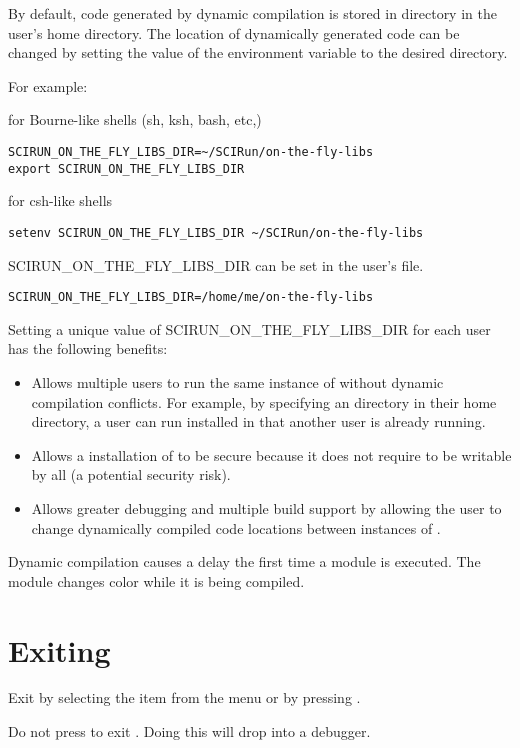 By default, code generated by dynamic compilation is stored in
directory  in the user's home directory.
The location of dynamically generated code can be changed by setting
the value of the environment variable
 to the desired directory.

For example:

for Bourne-like shells (sh, ksh, bash, etc,)

\begin{verbatim}
SCIRUN_ON_THE_FLY_LIBS_DIR=~/SCIRun/on-the-fly-libs
export SCIRUN_ON_THE_FLY_LIBS_DIR
\end{verbatim}

for csh-like shells

\begin{verbatim}
setenv SCIRUN_ON_THE_FLY_LIBS_DIR ~/SCIRun/on-the-fly-libs
\end{verbatim}

SCIRUN\_ON\_THE\_FLY\_LIBS\_DIR can be set in the user's
 file.

\begin{verbatim}
SCIRUN_ON_THE_FLY_LIBS_DIR=/home/me/on-the-fly-libs
\end{verbatim}

Setting a unique value of SCIRUN\_ON\_THE\_FLY\_LIBS\_DIR for each
\sr{} user has the following benefits:

\begin{itemize}
\item Allows multiple users  to run the same 
  instance of \sr{} without
  dynamic compilation conflicts.  For example, by specifying an
   directory in their home directory, a user
  can run \sr{} installed in  that another user
  is already running.

\item Allows a  installation of \sr{}
  to be secure because it does not require
   to be writable by
  all (a potential security risk).

\item Allows greater debugging and multiple build support by
  allowing the user to change dynamically compiled code locations
  between instances of \sr{}.

\end{itemize}

Dynamic compilation causes a delay the first time a module is
executed.  The module changes color while it is being
compiled.

\section{Exiting \sr{}}
\label{sec:stopping}

Exit \sr{} by selecting the  item from the 
menu or by pressing .

Do not press  to exit \sr{}.  Doing this will drop
\sr{} into a debugger.


